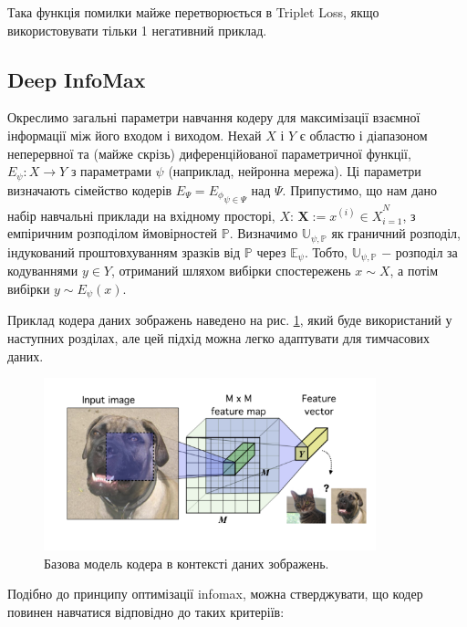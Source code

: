 \vspace{1.5em}

Така функція помилки майже перетворюється в Triplet Loss, якщо використовувати тільки 1 негативний приклад.

\subsection{Deep InfoMax}

Окреслимо загальні параметри навчання кодеру для максимізації взаємної інформації між його входом і виходом. Нехай $X$ і $Y$ є областю і діапазоном неперервної та (майже скрізь) диференційованої параметричної функції, $E_{\psi}: X \rightarrow Y$ з параметрами $\psi$ (наприклад, нейронна мережа). Ці параметри визначають сімейство кодерів $E_{\Psi} = {E_{\phi}}_{\psi \in \Psi}$ над $\Psi$. Припустимо, що нам дано набір навчальні приклади на вхідному просторі, $X$: $\mathbf{X} := {x^{(i)} \in X}^{N}_{i = 1}$, з емпіричним розподілом ймовірностей $\mathbb{P}$. Визначимо $\mathbb{U_{\psi,P}}$ як граничний розподіл, індукований проштовхуванням зразків від $\mathbb{P}$ через $\mathbb{E_{\psi}}$. Тобто, $\mathbb{U_{\psi, P}}$ $-$ розподіл за кодуваннями $y \in Y$, отриманий шляхом вибірки спостережень $x \sim X$, а потім вибірки $y \sim E_{\psi}(x)$.

Приклад кодера даних зображень наведено на рис. \ref{fig:deepinfo1}, який буде використаний у наступних розділах, але цей підхід можна легко адаптувати для тимчасових даних. 

\vspace{1em}

\begin{figure}[h]
  \includegraphics[width=\textwidth, height=5cm, natwidth=277, natheight=144]{Mal/deepinfo1.jpg}
  \caption{Базова модель кодера в контексті даних зображень.}
  \label{fig:deepinfo1}
\end{figure}

Подібно до принципу оптимізації infomax, можна стверджувати, що кодер повинен навчатися відповідно до таких критеріїв:

